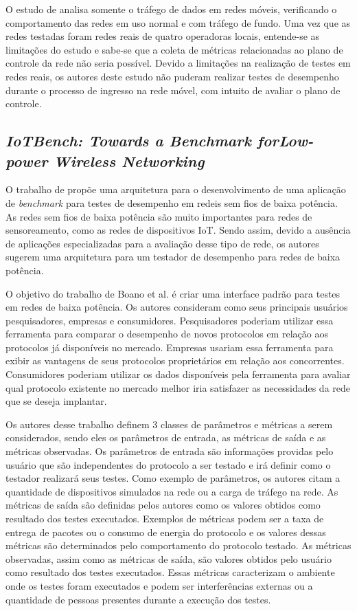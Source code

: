 O estudo de \cite{Garcia2015} analisa somente o tráfego de dados em redes móveis, verificando o comportamento das redes em uso normal e com tráfego de fundo.
Uma vez que as redes testadas foram redes reais de quatro operadoras locais, entende-se as limitações do estudo e sabe-se que a coleta de métricas relacionadas ao plano de controle da rede não seria possível.
Devido a limitações na realização de testes em redes reais, os autores deste estudo não puderam realizar testes de desempenho durante o processo de ingresso na rede móvel, com intuito de avaliar o plano de controle.

\subsection{\textit{IoTBench: Towards a Benchmark forLow-power Wireless Networking}}

O trabalho de \cite{Boano2018} propõe uma arquitetura para o desenvolvimento de uma aplicação de \textit{benchmark} para testes de desempenho em redeis sem fios de baixa potência.
As redes sem fios de baixa potência são muito importantes para redes de sensoreamento, como as redes de dispositivos IoT.
Sendo assim, devido a ausência de aplicações especializadas para a avaliação desse tipo de rede, os autores sugerem uma arquitetura para um testador de desempenho para redes de baixa potência.

O objetivo do trabalho de Boano et al. é criar uma interface padrão para testes em redes de baixa potência. Os autores consideram como seus principais usuários pesquisadores, empresas e consumidores.
Pesquisadores poderiam utilizar essa ferramenta para comparar o desempenho de novos protocolos em relação aos protocolos já disponíveis no mercado.
Empresas usariam essa ferramenta para exibir as vantagens de seus protocolos proprietários em relação aos concorrentes.
Consumidores poderiam utilizar os dados disponíveis pela ferramenta para avaliar qual protocolo existente no mercado melhor iria satisfazer as necessidades da rede que se deseja implantar.

Os autores desse trabalho definem 3 classes de parâmetros e métricas a serem considerados, sendo eles os parâmetros de entrada, as métricas de saída e as métricas observadas.
Os parâmetros de entrada são informações providas pelo usuário que são independentes do protocolo a ser testado e irá definir como o testador realizará seus testes. Como exemplo de parâmetros, os autores citam a quantidade de dispositivos simulados na rede ou a carga de tráfego na rede.
As métricas de saída são definidas pelos autores como os valores obtidos como resultado dos testes executados. Exemplos de métricas podem ser a taxa de entrega de pacotes ou o consumo de energia do protocolo e os valores dessas métricas são determinados pelo comportamento do protocolo testado.
As métricas observadas, assim como as métricas de saída, são valores obtidos pelo usuário como resultado dos testes executados. Essas métricas caracterizam o ambiente onde os testes foram executados e podem ser interferências externas ou a quantidade de pessoas presentes durante a execução dos testes.

